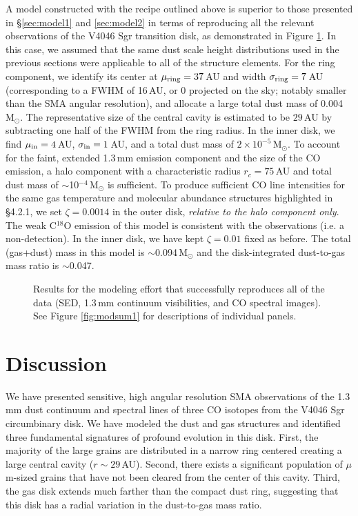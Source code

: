 {A model constructed with the recipe outlined above is superior to those 
presented in \S\ref{sec:model1} and \ref{sec:model2} in terms of reproducing all
the relevant observations of the V4046 Sgr transition disk, as
demonstrated in Figure \ref{fig:modsum3}.  In this case, we assumed that the 
same dust scale height distributions used in the previous sections were 
applicable to all of the structure elements.  For the ring component, we 
identify its center at $\mu_{\rm ring} = 37$\,AU and width $\sigma_{\rm ring} = 
7$\,AU (corresponding to a FWHM of 16\,AU, or 0 projected on the sky; 
notably smaller than the SMA angular resolution), and allocate a large total 
dust mass of 0.004\,M$_{\odot}$.  The representative size of the 
central cavity is estimated to be $29$\,AU by subtracting one half of the FWHM 
from the ring radius.  In the inner disk, we find 
$\mu_{\rm in} = 4$\,AU, $\sigma_{\rm in} = 1$\,AU, and a total dust mass of
$2\times10^{-5}$\,M$_{\odot}$.  To account for the faint, extended 1.3\,mm 
emission component and the size of the CO emission, a halo component with a 
characteristic radius $r_c = 75$\,AU and total dust mass of 
$\sim$10$^{-4}$\,M$_{\odot}$ is sufficient.  To produce sufficient CO line 
intensities for the same gas temperature and molecular abundance structures
highlighted in \S 4.2.1, we set $\zeta = 0.0014$ in the outer disk, 
{\it relative to the halo component only}.  The weak C$^{18}$O emission of this 
model is consistent with the observations (i.e. a non-detection).  In the inner 
disk, we have kept 
$\zeta = 0.01$ fixed as before.  The total (gas+dust) mass in this model is 
$\sim$0.094\,M$_{\odot}$ and the disk-integrated dust-to-gas mass ratio is 
$\sim$0.047.

\begin{figure}[t!]
\caption{Results for the modeling effort that successfully reproduces all of 
the data (SED, 1.3\,mm continuum visibilities, and CO spectral images).  See 
Figure \ref{fig:modsum1} for descriptions of individual panels.  
\label{fig:modsum3}}
\end{figure}

\clearpage

\section{Discussion}\label{sec:discussion}

We have presented sensitive, high angular resolution SMA observations of the 
1.3\,mm dust continuum and spectral lines of three CO isotopes from the V4046 
Sgr circumbinary disk. We have modeled the dust and gas structures and 
identified three fundamental signatures of profound evolution in this disk.  
First, the majority of the large grains are distributed in a narrow ring 
centered creating a large central cavity ($r\sim29$\,AU).  Second, there exists 
a significant population of $\mu$m-sized grains that have not been cleared from 
the center of this cavity.  Third, the gas disk extends much farther than the 
compact dust ring, suggesting that this disk has a radial variation in the 
dust-to-gas mass ratio.

}
